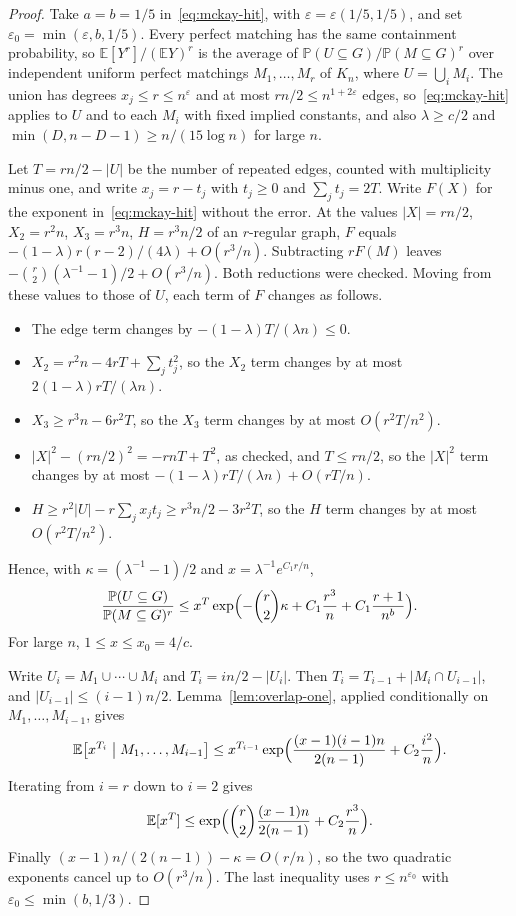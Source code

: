 \documentclass[11pt]{article}
\newcommand{\EE}{\mathbb{E}}
\newcommand{\PP}{\mathbb{P}}
\begin{document}
\begin{proof}
Take \(a=b=1/5\) in~\eqref{eq:mckay-hit}, with \(\varepsilon=\varepsilon(1/5,1/5)\), and
set \(\varepsilon_0=\min(\varepsilon,b,1/5)\).
Every perfect matching has the same containment probability, so
\(\EE[Y^r]/(\EE Y)^r\) is the average of
\(\PP(U\subseteq G)/\PP(M\subseteq G)^r\) over independent uniform perfect
matchings \(M_1,\ldots,M_r\) of \(K_n\), where \(U=\bigcup_iM_i\).
The union has degrees \(x_j\le r\le n^{\varepsilon}\) and at most
\(rn/2\le n^{1+2\varepsilon}\) edges, so~\eqref{eq:mckay-hit} applies to \(U\)
and to each \(M_i\) with fixed implied constants, and also
\(\lambda\ge c/2\) and \(\min(D,n-D-1)\ge n/(15\log n)\) for large \(n\).

Let \(T=rn/2-|U|\) be the number of repeated edges, counted with multiplicity
minus one, and write \(x_j=r-t_j\) with \(t_j\ge0\) and \(\sum_jt_j=2T\).
Write \(F(X)\) for the exponent in~\eqref{eq:mckay-hit} without the error.
At the values \(|X|=rn/2\), \(X_2=r^2n\), \(X_3=r^3n\), \(H=r^3n/2\) of an
\(r\)-regular graph, \(F\) equals
\(-(1-\lambda)r(r-2)/(4\lambda)+O(r^3/n)\).
Subtracting \(rF(M)\) leaves
\(-\binom r2(\lambda^{-1}-1)/2+O(r^3/n)\).
Both reductions were checked.
Moving from these values to those of \(U\), each term of \(F\) changes as
follows.
\begin{itemize}
\item The edge term changes by \(-(1-\lambda)T/(\lambda n)\le0\).
\item \(X_2=r^2n-4rT+\sum_jt_j^2\), so the \(X_2\) term changes by at most
\(2(1-\lambda)rT/(\lambda n)\).
\item \(X_3\ge r^3n-6r^2T\), so the \(X_3\) term changes by at most
\(O(r^2T/n^2)\).
\item \(|X|^2-(rn/2)^2=-rnT+T^2\), as checked, and \(T\le rn/2\), so the
\(|X|^2\) term changes by at most \(-(1-\lambda)rT/(\lambda n)+O(rT/n)\).
\item \(H\ge r^2|U|-r\sum_jx_jt_j\ge r^3n/2-3r^2T\), so the \(H\) term changes
by at most \(O(r^2T/n^2)\).
\end{itemize}
Hence, with \(\kappa=(\lambda^{-1}-1)/2\) and \(x=\lambda^{-1}e^{C_1r/n}\),
\[
\frac{\PP(U\subseteq G)}{\PP(M\subseteq G)^r}
\le
x^{T}\exp\Bigl(-\binom r2\kappa+C_1\frac{r^3}{n}+C_1\frac{r+1}{n^{b}}\Bigr).
\]
For large \(n\), \(1\le x\le x_0=4/c\).

Write \(U_i=M_1\cup\cdots\cup M_i\) and \(T_i=in/2-|U_i|\).
Then \(T_i=T_{i-1}+|M_i\cap U_{i-1}|\), and \(|U_{i-1}|\le(i-1)n/2\).
Lemma~\ref{lem:overlap-one}, applied conditionally on \(M_1,\ldots,M_{i-1}\),
gives
\[
\EE\bigl[x^{T_i}\bigm|M_1,\ldots,M_{i-1}\bigr]
\le
x^{T_{i-1}}\exp\Bigl(\frac{(x-1)(i-1)n}{2(n-1)}+C_2\frac{i^2}{n}\Bigr).
\]
Iterating from \(i=r\) down to \(i=2\) gives
\[
\EE[x^T]\le\exp\Bigl(\binom r2\frac{(x-1)n}{2(n-1)}+C_2\frac{r^3}{n}\Bigr).
\]
Finally \((x-1)n/(2(n-1))-\kappa=O(r/n)\), so the two quadratic exponents
cancel up to \(O(r^3/n)\).
The last inequality uses \(r\le n^{\varepsilon_0}\) with \(\varepsilon_0\le\min(b,1/3)\).
\end{proof}
\end{document}
